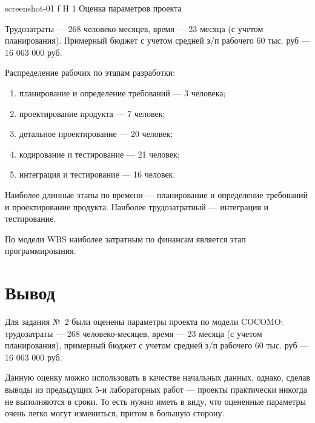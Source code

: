 \documentclass{bmstu}
\begin{document}
    {screenshot-01}
    {f}
    {H}
    {1\textwidth}
    {Оценка параметров проекта}
    
Трудозатраты --- 268 человеко-месяцев, время --- 23 месяца (с учетом планирования). 
Примерный бюджет с учетом средней з/п рабочего 60 тыс. руб --- 16 063 000 руб.

Распределение рабочих по этапам разработки:
\begin{enumerate}
\item[1)] планирование и определение требований --- 3 человека;
\item[2)] проектирование продукта --- 7 человек;
\item[3)] детальное проектирование --- 20 человек;
\item[4)] кодирование и тестирование --- 21 человек;
\item[5)] интеграция и тестирование --- 16 человек.
\end{enumerate}

Наиболее длинные этапы по времени --- планирование и определение требований и проектирование продукта. 
Наиболее трудозатратный --- интеграция и тестирование.

По модели WBS наиболее затратным по финансам является этап программирования.
    
\section{Вывод}

Для задания №~2 были оценены параметры проекта по модели COCOMO: трудозатраты --- 268 человеко-месяцев, время --- 23 месяца (с учетом планирования), примерный бюджет с учетом средней з/п рабочего 60 тыс. руб --- 16 063 000 руб.

Данную оценку можно использовать в качестве начальных данных, однако, сделав выводы из предыдущих 5-и лабораторных работ --- проекты практически никогда не выполняются в сроки. 
То есть нужно иметь в виду, что оцененные параметры очень легко могут измениться, притом в большую сторону.
\end{document}

